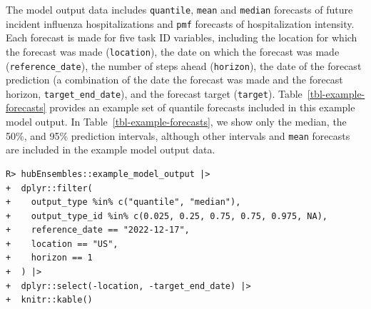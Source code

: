 \documentclass[
  article,
  shortnames,
  notitle]{jss}
\begin{document}
The model output data includes \texttt{quantile}, \texttt{mean} and
\texttt{median} forecasts of future incident influenza hospitalizations
and \texttt{pmf} forecasts of hospitalization intensity. Each forecast
is made for five task ID variables, including the location for which the
forecast was made (\texttt{location}), the date on which the forecast
was made (\texttt{reference\_date}), the number of steps ahead
(\texttt{horizon}), the date of the forecast prediction (a combination
of the date the forecast was made and the forecast horizon,
\texttt{target\_end\_date}), and the forecast target (\texttt{target}).
Table~\ref{tbl-example-forecasts} provides an example set of quantile
forecasts included in this example model output. In
Table~\ref{tbl-example-forecasts}, we show only the median, the 50\%,
and 95\% prediction intervals, although other intervals and
\texttt{mean} forecasts are included in the example model output data.

\begin{verbatim}
R> hubEnsembles::example_model_output |>
+  dplyr::filter(
+    output_type %in% c("quantile", "median"),
+    output_type_id %in% c(0.025, 0.25, 0.75, 0.75, 0.975, NA),
+    reference_date == "2022-12-17",
+    location == "US",
+    horizon == 1
+  ) |>
+  dplyr::select(-location, -target_end_date) |>
+  knitr::kable()
\end{verbatim}
\end{document}
